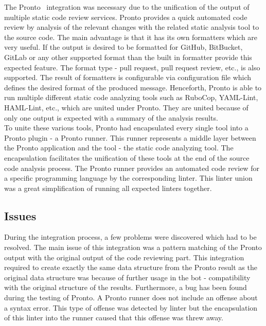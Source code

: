 The Pronto~\cite{GITHUB-PRONTO} integration was necessary due to the unification of the output of multiple static code review services. Pronto provides a quick automated code review by analysis of the relevant changes with the related static analysis tool to the source code. The main advantage is that it has its own formatters which are very useful. If the output is desired to be formatted for GitHub, BitBucket, GitLab or any other supported format than the built in formatter provide this expected feature. The format type - pull request, pull request review, etc., is also supported. The result of formatters is configurable via configuration file which defines the desired format of the produced message. Henceforth, Pronto is able to run multiple different static code analyzing tools such as RuboCop, YAML-Lint, HAML-Lint, etc., which are united under Pronto. They are united because of only one output is expected with a summary of the analysis results.\\

To unite these various tools, Pronto had encapsulated every single tool into a Pronto plugin - a Pronto runner. This runner represents a middle layer between the Pronto application and the tool - the static code analyzing tool. The encapsulation facilitates the unification of these tools at the end of the source code analysis process. The Pronto runner provides an automated code review for a specific programming language by the corresponding linter. This linter union was a great simplification of running all expected linters together.

\subsection{Issues}

During the integration process, a few problems were discovered which had to be resolved. The main issue of this integration was a pattern matching of the Pronto output with the original output of the code reviewing part. This integration required to create exactly the same data structure from the Pronto result as the original data structure was because of further usage in the bot - compatibility with the original structure of the results. Furthermore, a bug has been found during the testing of Pronto. A Pronto runner does not include an offense about a syntax error. This type of offense was detected by linter but the encapsulation of this linter into the runner caused that this offense was threw away.

